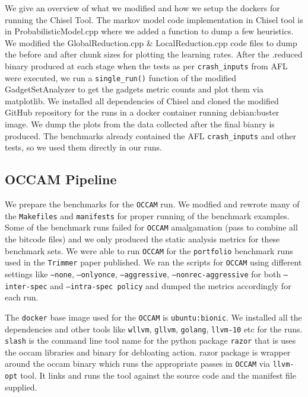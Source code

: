 \documentclass{relatorio}
\begin{document}
We give an overview of what we modified and how we setup the dockers for running the Chisel Tool. The markov model  code implementation in Chisel tool is in ProbabilisticModel.cpp where we added a function to dump a few heuristics.
We modified the GlobalReduction.cpp \& LocalReduction.cpp code files to dump the before and after chunk sizes for plotting the learning rates. After the .reduced binary produced at each stage when the tests as per \texttt{crash\_inputs} from AFL were executed, we run a \texttt{single\_run()} function of the modified GadgetSetAnalyzer to get the gadgets metric counts and plot them via matplotlib. We installed all dependencies of Chisel and cloned the modified GitHub repository for the runs in a docker container running debian:buster image. We dump the plots from the data collected after the final bianry is produced. The benchmarks already contained the AFL \texttt{crash\_inputs} and other tests, so we used them directly in our runs. 

\subsection{OCCAM Pipeline}%
\label{Tools}

We prepare the benchmarks for the \texttt{OCCAM} run. We modfied and rewrote many of the \texttt{Makefiles} and \texttt{manifests} for proper running of the benchmark examples. Some of the benchmark runs failed for \texttt{OCCAM} amalgamation (pass to combine all the bitcode files) and we only produced the static analysis metrics for these benchmark sets. We were able to run \texttt{OCCAM} for the \texttt{portfolio} benchmark runs used in the \texttt{Trimmer} paper published. We ran the scripts for \texttt{OCCAM} using different settings like \texttt{--none}, \texttt{--onlyonce}, \texttt{--aggressive}, \texttt{--nonrec-aggressive} for both \texttt{--inter-spec} and \texttt{--intra-spec policy} and dumped the metrics accordingly for each run. 

The \texttt{docker} base image used for the \texttt{OCCAM} is \texttt{ubuntu:bionic}. We installed all the dependencies and other tools like \texttt{wllvm}, \texttt{gllvm}, \texttt{golang}, \texttt{llvm-10} etc for the runs. \texttt{slash} is the command line tool name for the python package \texttt{razor} that is uses the occam libraries and binary for debloating action. razor package is wrapper around the occam binary which runs the appropriate passes in \texttt{OCCAM} via \texttt{llvm-opt} tool. It links and runs the tool against the source code and the manifest file supplied. 
\end{document}
